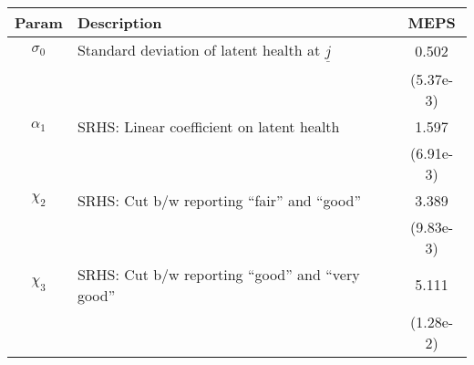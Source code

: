 \begin{table}[ht]\label{MEPSwomenSRHSparams}
\footnotesize
\begin{center}
\begin{tabular}{clc}
\hline \hline
Param & Description & MEPS \\
\hline
$\sigma_{0}$ & Standard deviation of latent health at $\underline{j}$ & 0.502 \\
 & & (5.37e-3) \\
$\alpha_1$ & SRHS: Linear coefficient on latent health & 1.597 \\
 & & (6.91e-3) \\
$\chi_2$ & SRHS: Cut b/w reporting ``fair'' and ``good'' & 3.389 \\
 & & (9.83e-3) \\
$\chi_3$ & SRHS: Cut b/w reporting ``good'' and ``very good'' & 5.111 \\
 & & (1.28e-2) \\
\hline\hline
\end{tabular}
\end{center}
\end{table}
